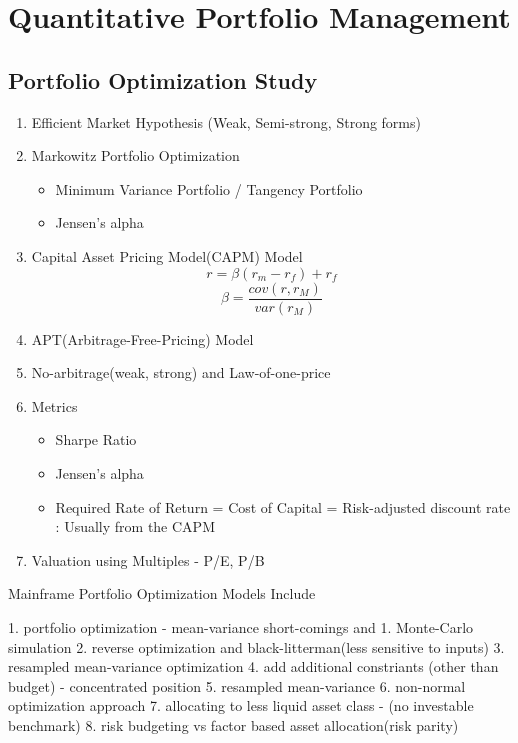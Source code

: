\documentclass[11pt, openany]{book}              %
\begin{document}
\part{Quantitative Portfolio Management}
\chapter{Portfolio Optimization Study}


\begin{enumerate}
 \item Efficient Market Hypothesis (Weak, Semi-strong, Strong forms)
 \item Markowitz Portfolio Optimization
 \begin{itemize}
    \item Minimum Variance Portfolio / Tangency Portfolio 
    \item Jensen's alpha
  \end{itemize}

  \item Capital Asset Pricing Model(CAPM) Model \\
        $$ r = \beta(r_m - r_f) + r_f $$
 		$$\beta = \frac{cov(r,r_M)}{var(r_M)}$$
  \item APT(Arbitrage-Free-Pricing) Model 
 \item No-arbitrage(weak, strong) and Law-of-one-price
 \item Metrics
  \begin{itemize}
    \item Sharpe Ratio
    \item Jensen's alpha
    
        \item Required Rate of Return = Cost of Capital = Risk-adjusted discount rate : Usually from the CAPM
   \end{itemize}
 \item Valuation using Multiples - P/E, P/B 
 \end{enumerate}




Mainframe Portfolio Optimization Models Include

    1. portfolio optimization - mean-variance short-comings and 
        1. Monte-Carlo simulation
        2. reverse optimization and black-litterman(less sensitive to inputs)
        3. resampled mean-variance optimization
        4. add additional constriants (other than budget) - concentrated position
        5. resampled mean-variance
        6. non-normal optimization approach
        7. allocating to less liquid asset class - (no investable benchmark)
        8. risk budgeting vs factor based asset allocation(risk parity)
\end{document}
